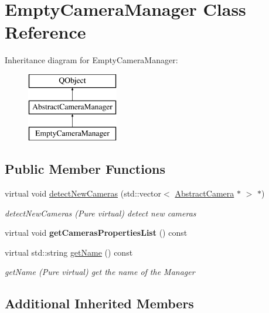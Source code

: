 \hypertarget{class_empty_camera_manager}{\section{Empty\-Camera\-Manager Class Reference}
\label{class_empty_camera_manager}
}
Inheritance diagram for Empty\-Camera\-Manager\-:\begin{figure}[H]
\begin{center}
\leavevmode
\includegraphics[height=3.000000cm]{class_empty_camera_manager}
\end{center}
\end{figure}
\subsection*{Public Member Functions}
\begin{DoxyCompactItemize}
\item 
virtual void \hyperlink{class_empty_camera_manager_ae32a44d1576763cf49d46dba3aef0007}{detect\-New\-Cameras} (std\-::vector$<$ \hyperlink{class_abstract_camera}{Abstract\-Camera} $\ast$ $>$ $\ast$)
\begin{DoxyCompactList}\small\item\em detect\-New\-Cameras (Pure virtual) detect new cameras \end{DoxyCompactList}\item 
\hypertarget{class_empty_camera_manager_a321c93993d5bdd065f9ea875ee7b7961}{virtual void {\bfseries get\-Cameras\-Properties\-List} () const }\label{class_empty_camera_manager_a321c93993d5bdd065f9ea875ee7b7961}

\item 
virtual std\-::string \hyperlink{class_empty_camera_manager_acd29e9bb06b9839e5c94b6ffe5ee86a9}{get\-Name} () const 
\begin{DoxyCompactList}\small\item\em get\-Name (Pure virtual) get the name of the Manager \end{DoxyCompactList}\end{DoxyCompactItemize}
\subsection*{Additional Inherited Members}


